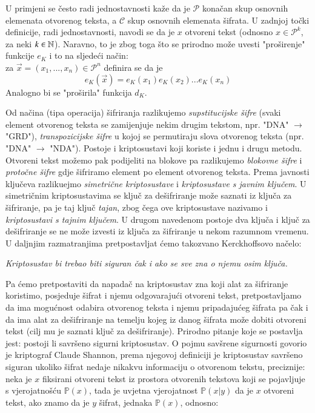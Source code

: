 \documentclass[a4paper,oneside,12pt]{memoir} %
\begin{document}
\begin{spacing}{1.5}
\begin{defn}
\begin{itemize}
\end{itemize}
\end{defn}
\begin{rem}
U primjeni se često radi jednostavnosti kaže da je $\mathcal{P}$ konačan skup osnovnih elemenata otvorenog teksta, a $\mathcal{C}$ skup osnovnih elemenata šifrata. U zadnjoj točki definicije, radi jednostavnosti, navodi se da je $x$ otvoreni tekst (odnosno $x \in \mathcal{P}^k$, za neki $k \in \mathbb{N}$). Naravno, to je zbog toga što se prirodno može uvesti "proširenje" funkcije $e_K$ i to na sljedeći način: \\ 
za $\vec{x}=(x_1,...,x_n) \in \mathcal{P}^n$ definira se da je \[e_K(\vec{x})=e_K(x_1)e_K(x_2)...e_K(x_n)\]
Analogno bi se "proširila" funkcija $d_K$. 
\end{rem}
Od načina (tipa operacija) šifriranja razlikujemo \textit{supstitucijske šifre} (svaki element otvorenog teksta se zamijenjuje nekim drugim tekstom, npr. "DNA" $\to$ "GRD"), \textit{transpozicijske šifre} u kojoj se permutiraju slova otvorenog teksta (npr. "DNA" $\to$ "NDA"). Postoje i kriptosustavi koji koriste i jednu i drugu metodu. Otvoreni tekst možemo pak podijeliti na blokove pa razlikujemo \textit{blokovne šifre} i  \textit{protočne šifre}	gdje šifriramo element po element otvorenog teksta. Prema javnosti ključeva razlikuejmo \textit{simetrične kriptosustave} i \textit{kriptosustave s javnim ključem}. U simetričnim kriptosustavima se ključ za dešifriranje može saznati iz ključa za šifriranje, pa je taj ključ \textit{tajan}, zbog čega ove kriptosustave nazivamo i \textit{kriptosustavi s tajnim ključem}. U drugom navedenom postoje dva ključa i ključ za dešifriranje se ne može izvesti iz ključa za šifriranje u nekom razumnom vremenu. U daljnjim razmatranjima pretpostavljat ćemo takozvano Kerckhoffsovo načelo:
\begin{center}
	\textit{Kriptosustav bi trebao biti siguran čak i ako se sve zna o njemu osim ključa.}
\end{center}
Pa ćemo pretpostaviti da napadač na kriptosustav zna koji alat za šifriranje koristimo, posjeduje šifrat i njemu odgovarajući otvoreni tekst, pretpostavljamo da ima mogućnost odabira otvorenog teksta i njemu pripadajućeg šifrata pa čak i da ima alat za dešifriranje na temelju kojeg iz danog šifrata može dobiti otvoreni tekst (cilj mu je saznati ključ za dešifriranje). Prirodno pitanje koje se postavlja jest: postoji li savršeno sigurni kriptosustav. O pojmu savšrene sigurnosti govorio je kriptograf Claude Shannon, prema njegovoj definiciji je kriptosustav savršeno siguran ukoliko šifrat nedaje nikakvu informaciju o otvorenom tekstu, preciznije: neka je $x$ fiksirani otvoreni tekst iz prostora otvorenih tekstova koji se pojavljuje s vjerojatnošću $\mathbb{P}(x)$, tada je uvjetna vjerojatnost $\mathbb{P}(x|y)$ da je $x$ otvoreni tekst, ako znamo da je $y$ šifrat, jednaka $\mathbb{P}(x)$, odnosno:

\end{spacing}
\end{document}
